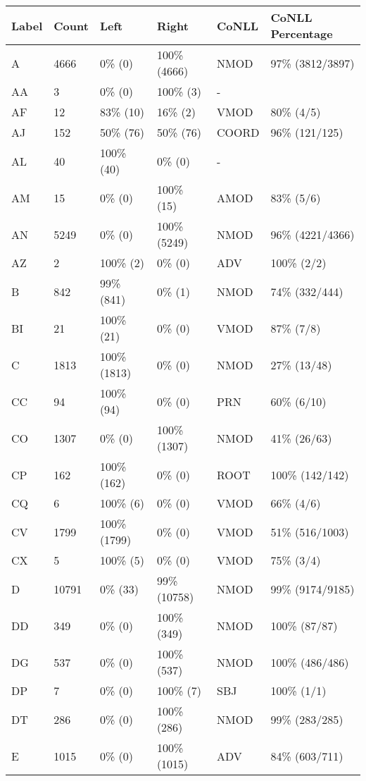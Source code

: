 \begin{figure*}
\begin{tabular}{|l|l|l|l||l|l|}
\hline
Label & Count & Left & Right & CoNLL & CoNLL Percentage\\ 
\hline
 A & 4666 & 0\% (0) & 100\% (4666) & NMOD & 97\% (3812/3897) \\ 
\hline
 AA & 3 & 0\% (0) & 100\% (3) & - &  \\ 
\hline
 AF & 12 & 83\% (10) & 16\% (2) & VMOD & 80\% (4/5) \\ 
\hline
 AJ & 152 & 50\% (76) & 50\% (76) & COORD & 96\% (121/125) \\ 
\hline
 AL & 40 & 100\% (40) & 0\% (0) & - &  \\ 
\hline
 AM & 15 & 0\% (0) & 100\% (15) & AMOD & 83\% (5/6) \\ 
\hline
 AN & 5249 & 0\% (0) & 100\% (5249) & NMOD & 96\% (4221/4366) \\ 
\hline
 AZ & 2 & 100\% (2) & 0\% (0) & ADV & 100\% (2/2) \\ 
\hline
 B & 842 & 99\% (841) & 0\% (1) & NMOD & 74\% (332/444) \\ 
\hline
 BI & 21 & 100\% (21) & 0\% (0) & VMOD & 87\% (7/8) \\ 
\hline
 C & 1813 & 100\% (1813) & 0\% (0) & NMOD & 27\% (13/48) \\ 
\hline
 CC & 94 & 100\% (94) & 0\% (0) & PRN & 60\% (6/10) \\ 
\hline
 CO & 1307 & 0\% (0) & 100\% (1307) & NMOD & 41\% (26/63) \\ 
\hline
 CP & 162 & 100\% (162) & 0\% (0) & ROOT & 100\% (142/142) \\ 
\hline
 CQ & 6 & 100\% (6) & 0\% (0) & VMOD & 66\% (4/6) \\ 
\hline
 CV & 1799 & 100\% (1799) & 0\% (0) & VMOD & 51\% (516/1003) \\ 
\hline
 CX & 5 & 100\% (5) & 0\% (0) & VMOD & 75\% (3/4) \\ 
\hline
 D & 10791 & 0\% (33) & 99\% (10758) & NMOD & 99\% (9174/9185) \\ 
\hline
 DD & 349 & 0\% (0) & 100\% (349) & NMOD & 100\% (87/87) \\ 
\hline
 DG & 537 & 0\% (0) & 100\% (537) & NMOD & 100\% (486/486) \\ 
\hline
 DP & 7 & 0\% (0) & 100\% (7) & SBJ & 100\% (1/1) \\ 
\hline
 DT & 286 & 0\% (0) & 100\% (286) & NMOD & 99\% (283/285) \\ 
\hline
 E & 1015 & 0\% (0) & 100\% (1015) & ADV & 84\% (603/711) \\ 

\end{tabular}
\end{figure*}

